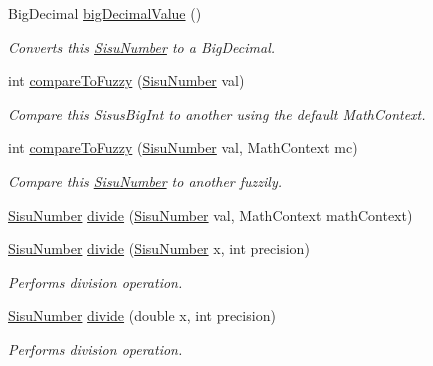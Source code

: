 \begin{DoxyCompactItemize}
Big\+Decimal \hyperlink{classcom_1_1aarrelaakso_1_1drawl_1_1_sisu_number_a75650999d142612f813ee7ba74ca1318}{big\+Decimal\+Value} ()
\begin{DoxyCompactList}\small\item\em Converts this \hyperlink{classcom_1_1aarrelaakso_1_1drawl_1_1_sisu_number}{Sisu\+Number} to a Big\+Decimal. \end{DoxyCompactList}\item 
int \hyperlink{classcom_1_1aarrelaakso_1_1drawl_1_1_sisu_number_a8f0df199b42a08c172c20b65638ea9c5}{compare\+To\+Fuzzy} (\hyperlink{classcom_1_1aarrelaakso_1_1drawl_1_1_sisu_number}{Sisu\+Number} val)
\begin{DoxyCompactList}\small\item\em Compare this Sisus\+Big\+Int to another using the default Math\+Context. \end{DoxyCompactList}\item 
int \hyperlink{classcom_1_1aarrelaakso_1_1drawl_1_1_sisu_number_ac07c3a93d7826a5bd68740460adc9426}{compare\+To\+Fuzzy} (\hyperlink{classcom_1_1aarrelaakso_1_1drawl_1_1_sisu_number}{Sisu\+Number} val, Math\+Context mc)
\begin{DoxyCompactList}\small\item\em Compare this \hyperlink{classcom_1_1aarrelaakso_1_1drawl_1_1_sisu_number}{Sisu\+Number} to another fuzzily. \end{DoxyCompactList}\item 
\hyperlink{classcom_1_1aarrelaakso_1_1drawl_1_1_sisu_number}{Sisu\+Number} \hyperlink{classcom_1_1aarrelaakso_1_1drawl_1_1_sisu_number_a7705a9d2011f9beed1410471280bd669}{divide} (\hyperlink{classcom_1_1aarrelaakso_1_1drawl_1_1_sisu_number}{Sisu\+Number} val, Math\+Context math\+Context)
\item 
\hyperlink{classcom_1_1aarrelaakso_1_1drawl_1_1_sisu_number}{Sisu\+Number} \hyperlink{classcom_1_1aarrelaakso_1_1drawl_1_1_sisu_number_af8ea0c173dc807cf23779f9d00f07a1a}{divide} (\hyperlink{classcom_1_1aarrelaakso_1_1drawl_1_1_sisu_number}{Sisu\+Number} x, int precision)
\begin{DoxyCompactList}\small\item\em Performs division operation. \end{DoxyCompactList}\item 
\hyperlink{classcom_1_1aarrelaakso_1_1drawl_1_1_sisu_number}{Sisu\+Number} \hyperlink{classcom_1_1aarrelaakso_1_1drawl_1_1_sisu_number_a376cc656c9d4ea71eaccf66a61f10666}{divide} (double x, int precision)
\begin{DoxyCompactList}\small\item\em Performs division operation. \end{DoxyCompactList}\item 

\end{DoxyCompactItemize}
